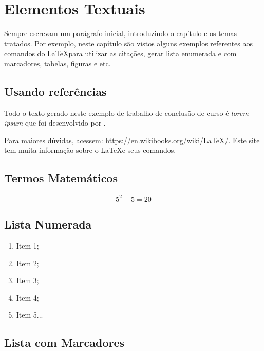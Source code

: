 \chapter{Elementos Textuais}

Sempre escrevam um parágrafo inicial, introduzindo o capítulo e os temas tratados. Por exemplo, neste capítulo são vistos alguns exemplos referentes aos comandos do \LaTeX  para utilizar as citações, gerar lista enumerada e com marcadores, tabelas, figuras e etc.

\section{Usando referências}

Todo o texto gerado neste exemplo de trabalho de conclusão de curso é \textit{lorem ipsum} que foi desenvolvido por .

Para maiores dúvidas, acessem: https://en.wikibooks.org/wiki/LaTeX/. Este site tem muita informação sobre o \LaTeX  e seus comandos.

\section{Termos Matemáticos}
\begin{equation} 
    \label{eq:equacao} %
    5^2 - 5 = 20
\end{equation}


\lipsum[1]%

\lipsum[1]%

\section{Lista Numerada}

\begin{enumerate}
 \item Item 1;
 \item Item 2;
 \item Item 3;
 \item Item 4;
 \item Item 5...
\end{enumerate}

\section{Lista com Marcadores}

